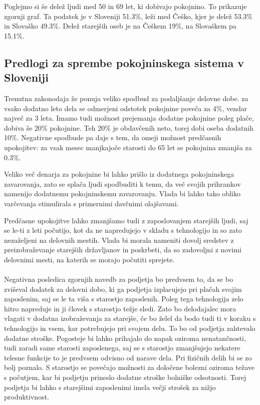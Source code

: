 \documentclass[12pt, a4paper]{article}
\begin{document}
Poglejmo si še delež ljudi med 50 in 69 let, ki dobivajo pokojnino. To prikazuje zgornji graf. Ta podatek je v Sloveniji 51.3\%, leži med Češko, kjer je delež 53.3\% in Slovaško 49.3\%. Delež starejših oseb je na Češkem 19\%, na Slovaškem pa 15.1\%.


\subsection[Predolgi za spremembe pokojninskega sistema v Sloveniji]{Predlogi za sprembe pokojninskega sistema v Sloveniji}

Trenutna zakonodaja že ponuja veliko spodbud za podaljšanje delovne dobe. za vsako dodatno leto dela se odmerjeni odstotek pokojnine poveča za 4\%, vendar največ za 3 leta. Imamo tudi možnost prejemanja dodatne pokojnine poleg plače, dobiva še 20\% pokojnine. Teh 20\% je obdavčenih neto, torej dobi oseba dodatnih 10\%. Negativne spodbude pa daje s tem, da omeji možnost predčasnih upokojitev: za vsak mesec manjkajoče starosti do 65 let se pokojnina zmanjša za 0.3\%.

\hspace*{5mm} Veliko več denarja za pokojnine bi lahko prišlo iz dodatnega pokojninskega zavarovanja, zato se splača ljudi spodbuditi k temu, da več svojih prihrankov namenijo dodatnemu pokojninskemu zavarovanju. Vlada bi lahko tako obliko varčevanja stimulirala s primernimi davčnimi olajšavami.\par

\hspace*{5mm} Predčasne upokojitve lahko zmanjšamo tudi z zaposlovanjem starejših ljudi, saj se le-ti z leti počutijo, kot da ne napredujejo v skladu s tehnologijo in so zato nezaželjeni na delovnih mestih. Vlada bi morala nameniti dovolj sredstev z preizobraževanje starejših državljanov in poskrbeti, da so zadovoljni z novimi delovnimi mesti, na katerih se morajo počutiti sprejete.
\\
\\
\hspace*{5mm} Negativna posledica zgornjih navedb za podjetja bo predvsem to, da se bo zviševal dodatek za delovni dobo, ki ga podjetja izplacujejo pri plačah svojim zaposlenim, saj se le ta viša s starostjo zaposlenih. Poleg tega tehnologija zelo hitro napreduje in ji človek s starostjo težje sledi. Zato bo delodajalec mora vlagati v  dodatna izobraževanja za starejše, če bo želel da bodo tudi ti v koraku s tehnologijo in vsem, kar potrebujejo pri svojem delu. To bo od podjetja zahtevalo dodatne stroške. Pogosteje bi lahko prihajalo do napak oziroma nenatančnosti, tudi zaradi same starosti zaposlenega, saj se s starostjo zmanjšujejo nekatere telesne funkcije to je predvsem odvisno od narave dela. Pri fizičnih delih bi se zo bolj poznalo. S starostjo se povečajo možnosti za določene bolezni oziroma težave s počutjem, kar bi podjetju prineslo dodatne stroške bolniške odsotnosti. Torej podjetja bi lahko s starejšimi zaposlenimi imela večji strošek za nižjo produktivnost.
\end{document}

